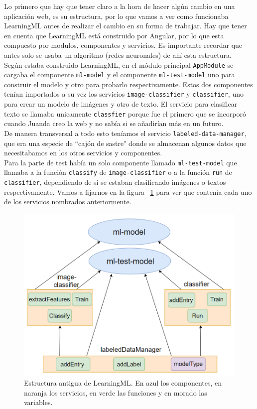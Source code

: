 \documentclass[a4paper, 12pt]{book}
\begin{document}
Lo primero que hay que tener claro a la hora de hacer algún cambio en una aplicación web, es su estructura, por lo que vamos a ver como funcionaba LearningML antes de realizar el cambio en su forma de trabajar. Hay que tener en cuenta que LearningML está construido por Angular, por lo que esta compuesto por modulos, componentes y servicios. Es importante recordar que antes solo se usaba un algoritmo (redes neuronales) de ahí esta estructura. \\
Según estaba construido LearningML, en el módulo principal \texttt{AppModule} se cargaba el componente \texttt{ml-model} y el componente \texttt{ml-test-model} uno para construir el modelo y otro para probarlo respectivamente. Estos dos componentes tenían importados a su vez los servicios \texttt{image-classifier} y \texttt{classifier}, uno para crear un modelo de imágenes y otro de texto. El servicio para clasificar texto se llamaba unicamente \texttt{classfier} porque fue el primero que se incorporó cuando Juanda creo la web y no sabía si se añadirían más en un futuro. \\
De manera transversal a todo esto teníamos el servicio \texttt{labeled-data-manager}, que era una especie de ``cajón de sastre"  donde se almacenan algunos datos que necesitabamos en los otros servicios y componentes.\\
Para la parte de test había un solo componente llamado \texttt{ml-test-model} que llamaba a la función \texttt{classify} de \texttt{image-classifier} o a la función  \texttt{run} de \texttt{classifier}, dependiendo de si se estaban clasificando imágenes o textos respectivamente.
Vamos a fijarnos en la figura ~\ref{fig:modeloantiguo} para ver que contenía cada uno de los servicios nombrados anteriormente.

\begin{figure}
	\centering
	\includegraphics[width=12cm, keepaspectratio]{img/modeloantiguo}
	\caption{Estructura antigua de LearningML. En azul los componentes, en naranja los servicios, en verde las funciones y en morado las variables.}				\label{fig:modeloantiguo}
\end{figure}
\end{document}
